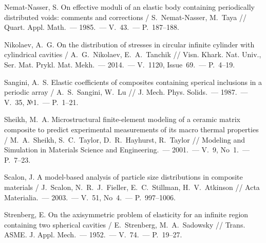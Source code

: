 \begin{biblist}{99}
Nemat-Nasser, S. 
On effective moduli of an elastic body containing periodically distributed voids: comments and corrections  
/ S.~Nemat-Nasser, M.~Taya 
// Quart. Appl. Math.~--- 1985.~--- V.~43.~--- P.~187--188.

Nikolaev, A.~G. 
On the distribution of stresses in circular infinite cylinder with cylindrical cavities 
/ A.~G.~Nikolaev, E.~A.~Tanchik 
// Visn. Khark. Nat. Univ., Ser. Mat. Prykl. Mat. Mekh.~--- 2014.~--- V.~1120, Issue~69.~--- P.~4--19.





Sangini, A.~S. 
Elastic coefficients of composites containing sperical inclusions in a periodic array  
/ A.~S.~Sangini, W.~Lu 
// J. Mech. Phys. Solids.~--- 1987.~--- V.~35, №1.~--- P.~1--21.

Sheikh, M.~A. 
Microstructural finite-element modeling of a ceramic matrix composite to predict experimental measurements of its macro thermal properties 
/ M.~A.~Sheikh, S.~C.~Taylor, D.~R.~Hayhurst, R.~Taylor 
// Modeling and Simulation in Materials Science and Engineering.~--- 2001.~--- V.~9, No~1.~--- P.~7--23.

Scalon, J. 
A model-based analysis of particle size distributions in composite materials 
/ J.~Scalon, N.~R.~J.~Fieller, E.~C.~Stillman, H.~V.~Atkinson 
// Acta Materialia.~--- 2003.~--- V.~51, No~4.~--- P.~997--1006.

Strenberg, E. 
On the axisymmetric problem of elasticity for an infinite region containing two spherical cavities 
/ E.~Strenberg, M.~A.~Sadowsky 
// Trans. ASME. J. Appl. Mech.~--- 1952.~--- V.~74.~--- P.~19--27.


\end{biblist}
